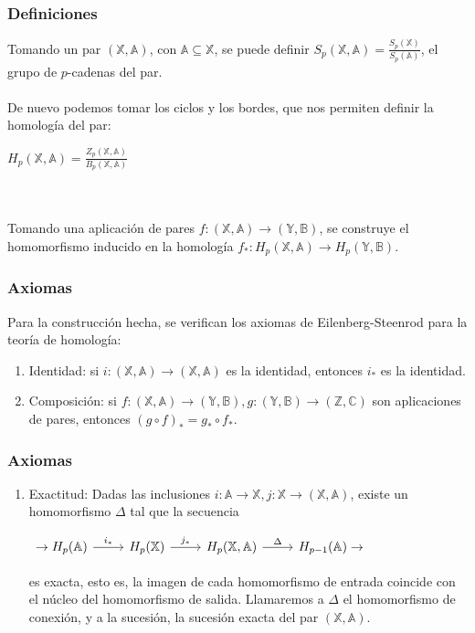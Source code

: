 \documentclass{beamer}
\def\X{{\mathbb X}}
\def\A{{\mathbb A}}
\def\Y{{\mathbb Y}}
\def\B{{\mathbb B}}
\def\Z{{\mathbb Z}}
\def\C{{\mathbb C}}
\theoremstyle{theorem}
\newcounter{saveenumi}
\newcommand{\seti}{\setcounter{saveenumi}{\value{enumi}}}
\newcommand{\conti}{\setcounter{enumi}{\value{saveenumi}}}
\begin{document}

\begin{frame}
  \frametitle{Definiciones}
  Tomando un par $(\X, \A)$, con $\A \subseteq \X$, se puede definir $S_p(\X, \A) = \frac{S_p(\X)}{S_p(\A)}$,
  el grupo de $p$-cadenas del par. \\~\\

  De nuevo podemos tomar los ciclos y los bordes, que nos permiten definir la homología del par:
  \centerline{$H_p(\X, \A) = \frac{Z_p(\X, \A)}{B_p(\X, \A)}$} \\~\\

  Tomando una aplicación de pares $f \colon (\X, \A) \to (\Y, \B)$, se construye el homomorfismo inducido
  en la homología $f_* \colon H_p(\X, \A) \to H_p(\Y, \B)$.

\end{frame}


\begin{frame}
    \frametitle{Axiomas}
    Para la construcción hecha, se verifican los axiomas de Eilenberg-Steenrod para la teoría de homología:
    \begin{enumerate}
      \item Identidad: si $i \colon (\X, \A) \to (\X, \A)$ es la identidad, entonces $i_*$ es la identidad.
      \item Composición: si $f \colon (\X, \A) \to (\Y, \B), g \colon (\Y, \B) \to (\Z, \C)$ son aplicaciones de pares,
            entonces $(g \circ f)_* = g_* \circ f_*$.
    \seti
    \end{enumerate}

\end{frame}


\begin{frame}[fragile]
  \frametitle{Axiomas}
  \begin{enumerate}
    \conti
    \item Exactitud: Dadas las inclusiones $i \colon \A \to \X, j \colon \X \to (\X, \A)$, existe un homomorfismo $\Delta$ tal que la secuencia
    \begin{center}
      $ \begin{tikzcd}
        \to H_p(\A) \arrow{r}{i_*} & H_p(\X) \arrow{r}{j_*} & H_p(\X, \A) \arrow{r}{\Delta} & H_{p-1}(\A) \to
      \end{tikzcd} $
    \end{center}
    es exacta, esto es, la imagen de cada homomorfismo de entrada coincide con el núcleo del homomorfismo de salida.
    Llamaremos a $\Delta$ el homomorfismo de conexión, y a la sucesión, la sucesión exacta del par $(\X, \A)$.
    \seti
  \end{enumerate}
\end{frame}
\end{document}
